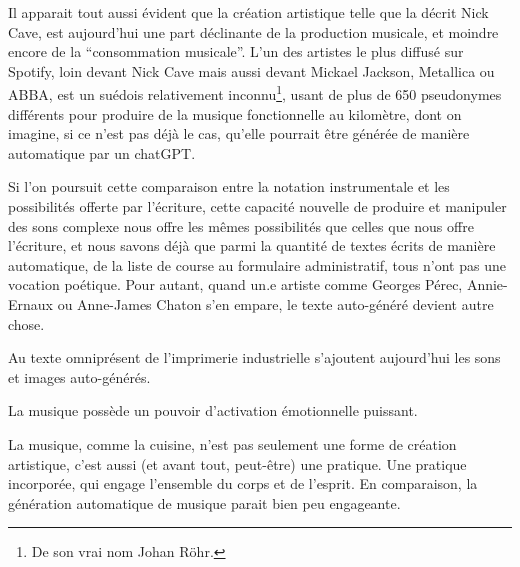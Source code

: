 Il apparait tout aussi évident que la création artistique telle que la décrit Nick Cave, est aujourd'hui une part déclinante de la production musicale, et moindre encore de la ``consommation musicale''. L'un des artistes le plus diffusé sur Spotify, loin devant Nick Cave mais aussi devant Mickael Jackson, Metallica ou ABBA, est un suédois relativement inconnu\footnote{De son vrai nom Johan Röhr.}, usant de plus de 650 pseudonymes différents pour produire de la musique fonctionnelle au kilomètre, dont on imagine, si ce n'est pas déjà le cas, qu'elle pourrait être générée de manière automatique par un chatGPT.

Si l'on poursuit cette comparaison entre la notation instrumentale et les possibilités offerte par l'écriture, cette capacité nouvelle de produire et manipuler des sons complexe nous offre les mêmes possibilités que celles que nous offre l'écriture, et nous savons déjà que parmi la quantité de textes écrits de manière automatique, de la liste de course au formulaire administratif, tous n'ont pas une vocation poétique. Pour autant, quand un.e artiste comme Georges Pérec, Annie-Ernaux ou Anne-James Chaton s'en empare, le texte auto-généré devient autre chose.

Au texte omniprésent de l'imprimerie industrielle s'ajoutent aujourd'hui les sons et images auto-générés.

La musique possède un pouvoir d'activation émotionnelle puissant.

La musique, comme la cuisine, n'est pas seulement une forme de création artistique, c'est aussi (et avant tout, peut-être) une pratique. Une pratique incorporée, qui engage l'ensemble du corps et de l'esprit. En comparaison, la génération automatique de musique parait bien peu engageante.





